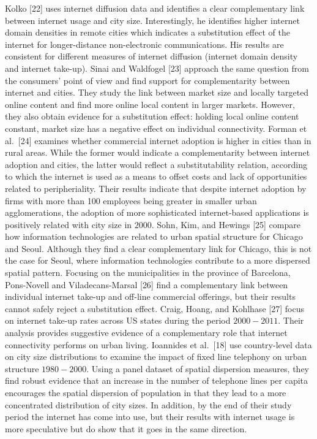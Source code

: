 \documentclass[10pt,letterpaper]{article}
\begin{document}
Kolko {[}22{]} uses internet diffusion data and identifies a clear
complementary link between internet usage and city size. Interestingly,
he identifies higher internet domain densities in remote cities which
indicates a substitution effect of the internet for longer-distance
non-electronic communications. His results are consistent for different
measures of internet diffusion (internet domain density and internet
take-up). Sinai and Waldfogel {[}23{]} approach the same question from
the consumers' point of view and find support for complementarity
between internet and cities. They study the link between market size and
locally targeted online content and find more online local content in
larger markets. However, they also obtain evidence for a substitution
effect: holding local online content constant, market size has a
negative effect on individual connectivity. Forman et al.~{[}24{]}
examines whether commercial internet adoption is higher in cities than
in rural areas. While the former would indicate a complementarity
between internet adoption and cities, the latter would reflect a
substitutability relation, according to which the internet is used as a
means to offset costs and lack of opportunities related to
peripheriality. Their results indicate that despite internet adoption by
firms with more than 100 employees being greater in smaller urban
agglomerations, the adoption of more sophisticated internet-based
applications is positively related with city size in \(2000\). Sohn,
Kim, and Hewings {[}25{]} compare how information technologies are
related to urban spatial structure for Chicago and Seoul. Although they
find a clear complementary link for Chicago, this is not the case for
Seoul, where information technologies contribute to a more dispersed
spatial pattern. Focusing on the municipalities in the province of
Barcelona, Pons-Novell and Viladecans-Marsal {[}26{]} find a
complementary link between individual internet take-up and off-line
commercial offerings, but their results cannot safely reject a
substitution effect. Craig, Hoang, and Kohlhase {[}27{]} focus on
internet take-up rates across US states during the period \(2000-2011\).
Their analysis provides suggestive evidence of a complementary role that
internet connectivity performs on urban living. Ioannides et
al.~{[}18{]} use country-level data on city size distributions to
examine the impact of fixed line telephony on urban structure
\(1980-2000\). Using a panel dataset of spatial dispersion measures,
they find robust evidence that an increase in the number of telephone
lines per capita encourages the spatial dispersion of population in that
they lead to a more concentrated distribution of city sizes. In
addition, by the end of their study period the internet has come into
use, but their results with internet usage is more speculative but do
show that it goes in the same direction.
\end{document}
